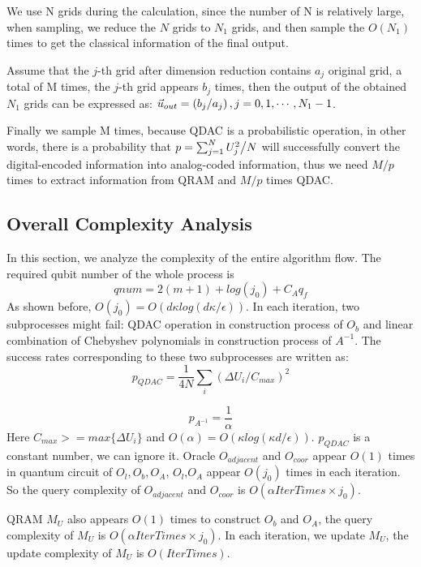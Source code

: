 \documentclass[%
 reprint,
 amsmath,amssymb,
pra,
]{revtex4-1}
\begin{document}
\begin{itemize}
We use N grids during the calculation,
since the number of N is relatively large,
when sampling, we reduce the $N$ grids to $N_1$ grids, 
and then sample the $O(N_1)$ times to get the classical information of the final output.

Assume that the $j$-th grid after dimension reduction contains $a_j$ original grid,
a total of M times, the $j$-th grid appears $b_j$ times, then the output of the obtained $N_1$ grids can be expressed as: ${\vec u_{out}} = \left( {{{{b_j}} \mathord{\left/
{\vphantom {{{b_j}} {{a_j}}}} \right. \kern-\nulldelimiterspace} {{a_j}}}} \right),j = 0,1, \cdots ,{N_1} - 1$.

Finally we sample M times,
because QDAC is a probabilistic operation,
in other words, 
there is a probability that $p = \sum\nolimits_{j = 1}^N {{{U_j^2} \mathord{\left/
{\vphantom {{U_j^2} N}} \right. \kern-\nulldelimiterspace} N}} $ will successfully convert 
the digital-encoded information into analog-coded information,
thus we need $M/p$ times to extract information from QRAM and $M/p$ times QDAC.



\subsection{Overall Complexity Analysis}

In this section, we analyze the complexity of the entire algorithm flow. The required qubit number of the whole process is 
$$
qnum=2(m+1)+log(j_0)+C_Aq_f
$$
As shown before, $O(j_0)=O(d\kappa log(d\kappa/\epsilon))$.
In each iteration, two subprocesses might fail: QDAC operation in construction process of $O_b$ and linear combination of Chebyshev polynomials in construction process of $A^{-1}$. The success rates corresponding to these two subprocesses are written as:
$$
p_{QDAC}=\frac{1}{4N}\sum_i{(\Delta U_i/C_{max})^2}
$$

$$
p_{A^{-1}}=\frac{1}{\alpha}
$$
Here $C_{max}>=max\{\Delta U_i\}$ and $O(\alpha)=O(\kappa log(\kappa d/\epsilon))$. $p_{QDAC}$ is a constant number, we can ignore it.
Oracle $O_{adjacent}$ and $O_{coor}$ appear $O(1)$ times in quantum circuit of $O_l,O_b,O_A$, $O_l$,$O_A$ appear $O(j_0)$ times in each iteration. So the query complexity of $O_{adjacent}$ and $O_{coor}$ is $O(\alpha IterTimes\times j_0)$.

QRAM $M_U$ also appears $O(1)$ times to construct $O_b$ and $O_A$, the query complexity of $M_U$ is $O(\alpha IterTimes\times j_0)$. In each iteration, we update $M_U$, the update complexity of $M_U$ is $O(IterTimes)$.


\end{itemize}
\end{document}
